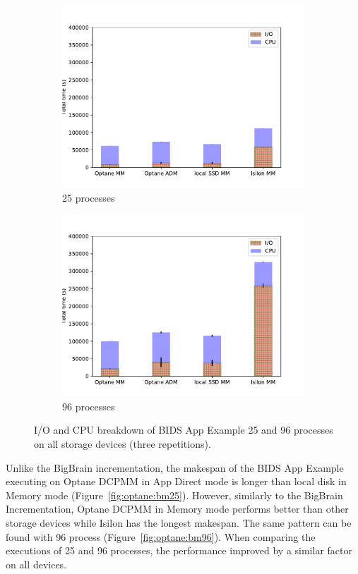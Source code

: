 \begin{figure}
    \begin{subfigure}{0.5\textwidth}
        \centering
    \includegraphics[width=\columnwidth]{figures/optane/25cores-sum.pdf}
    \caption{25 processes}\label{fig:optane:bb25}
\end{subfigure}
    \begin{subfigure}{0.5\textwidth}
        \centering
    \includegraphics[width=\columnwidth]{figures/optane/96cores-sum.pdf}
    \caption{96 processes}\label{fig:optane:bb96}
\end{subfigure}
\caption{I/O and CPU breakdown of BIDS App Example 25 and 96 processes on all
storage devices (three repetitions).}\label{fig:optane:bbd}
\captionsetup{belowskip=-10pt}
\end{figure}
Unlike the BigBrain incrementation, the makespan of the BIDS App Example
executing on Optane DCPMM in App Direct mode is longer than local disk in Memory
mode (Figure~\ref{fig:optane:bm25}). However, similarly to the BigBrain Incrementation,
Optane DCPMM in Memory mode performs better than other storage devices while
Isilon has the longest makespan. The same pattern can be found with 96 process
(Figure~\ref{fig:optane:bm96}). When comparing the executions of 25 and 96 processes,
the performance improved by a similar factor on all devices.

